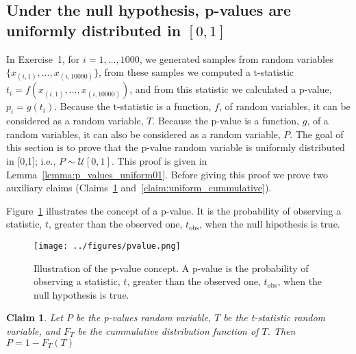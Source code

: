 \documentclass{article}
\newtheorem{claim}{Claim}
\def\fig_width{3.5in}
\begin{document}
\pagebreak
\begin{appendices}

\section{Under the null hypothesis, p-values are uniformly distributed in $[0,1]$}
\label{sec:pValuesAreUniform}

In Exercise~1, for $i=1,\ldots,1000$, we generated samples from random variables
$\{x_{(i,1)},\ldots,x_{(i,10000)}\}$, from these samples we computed a t-statistic
$t_i=f(x_{(i,1)},\ldots,x_{(i,10000)})$, and from this statistic we calculated a
p-value, $p_i=g(t_i)$. Because the t-statistic is a function, $f$, of random
variables, it can be considered as a random variable, $T$. Because the
p-value is a function, $g$, of a random variables, it can also be considered as
a random variable, $P$. The goal of this section is to prove that the p-value random
variable is uniformly distributed in [0,1]; i.e., $P\sim\mathcal{U}[0,1]$. This
proof is given in Lemma~\ref{lemma:p_values_uniform01}. Before giving this
proof we prove two auxiliary claims (Claims~\ref{claim:pvalue_as_function_of_stat}
and~\ref{claim:uniform_cummulative}).

Figure~\ref{fig:pvalue} illustrates the concept of a p-value. It is the
probability of observing a statistic, $t$, greater than the observed one,
$t_\text{obs}$, when the null hipothesis is true.

\begin{figure}[H]
    \begin{center}
        \texttt{[image: ../figures/pvalue.png]}

        \caption{Illustration of the p-value concept. A p-value is the
        probability of observing a statistic, $t$, greater than the observed
        one, $t_\text{obs}$, when the null hypothesis is true.}
        \label{fig:pvalue}

    \end{center}
\end{figure}

\begin{claim}

    Let $P$ be the p-values random variable, $T$ be the t-statistic random
    variable, and $F_T$ be the cummulative distribution function of $T$. Then
    $P=1-F_T(T)$
    \label{claim:pvalue_as_function_of_stat}

\end{claim}


\end{appendices}
\end{document}
